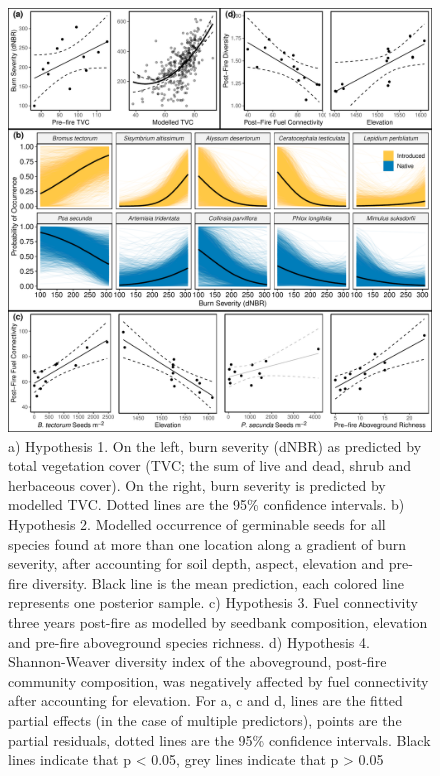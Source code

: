 \documentclass[
  12pt,
]{article}
\begin{document}
\begin{figure}
\centering
\includegraphics{images/big_plot.pdf}
\caption{a) Hypothesis 1. On the left, burn severity (dNBR) as predicted
by total vegetation cover (TVC; the sum of live and dead, shrub and
herbaceous cover). On the right, burn severity is predicted by modelled
TVC. Dotted lines are the 95\% confidence intervals. b) Hypothesis 2.
Modelled occurrence of germinable seeds for all species found at more
than one location along a gradient of burn severity, after accounting
for soil depth, aspect, elevation and pre-fire diversity. Black line is
the mean prediction, each colored line represents one posterior sample.
c) Hypothesis 3. Fuel connectivity three years post-fire as modelled by
seedbank composition, elevation and pre-fire aboveground species
richness. d) Hypothesis 4. Shannon-Weaver diversity index of the
aboveground, post-fire community composition, was negatively affected by
fuel connectivity after accounting for elevation. For a, c and d, lines
are the fitted partial effects (in the case of multiple predictors),
points are the partial residuals, dotted lines are the 95\% confidence
intervals. Black lines indicate that p \textless{} 0.05, grey lines
indicate that p \textgreater{} 0.05}
\end{figure}
\end{document}
